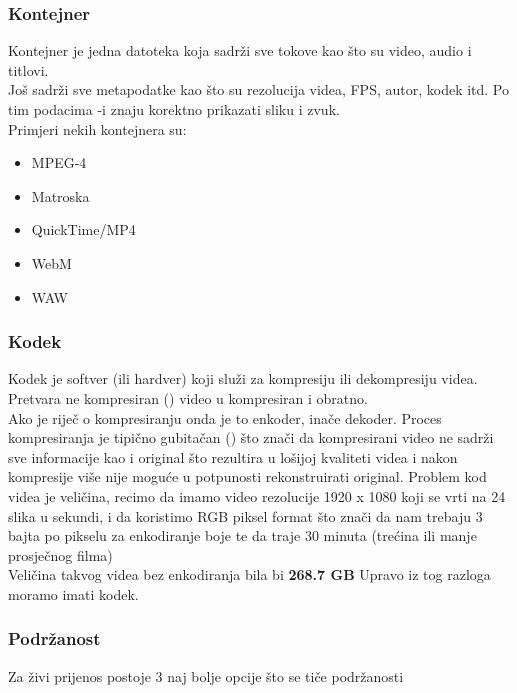 \subsubsection{Kontejner} \label{sec:container}
Kontejner je jedna datoteka koja sadrži sve tokove kao što su video, audio i titlovi.\\
Još sadrži sve metapodatke kao što su rezolucija videa, FPS, autor, kodek itd. Po tim 
podacima \hyperref[sct:videoPlayer]{}-i znaju korektno prikazati sliku i zvuk. \cite{ffmpegBook}
\\
Primjeri nekih kontejnera su:
\begin{itemize}
  \item MPEG-4
  \item Matroska
  \item QuickTime/MP4
  \item WebM
  \item WAW
\end{itemize}

\subsubsection{Kodek} \label{sec:codec}
Kodek je softver (ili hardver) koji služi za kompresiju ili dekompresiju videa. \\
Pretvara ne kompresiran () video u kompresiran i obratno. \\
Ako je riječ o kompresiranju onda je to enkoder, inače dekoder. \cite{ffmpegBook}
\paraBreak
Proces kompresiranja je tipično gubitačan () što znači da kompresirani video ne sadrži sve informacije kao i original
što rezultira u lošijoj kvaliteti videa i nakon kompresije više nije moguće u potpunosti rekonstruirati original. \cite{ffmpegBook}
\paraBreak
Problem kod videa je veličina, recimo da imamo video rezolucije 1920 x 1080 koji se vrti na 24 slika u sekundi, i da 
koristimo RGB piksel format što znači da nam trebaju 3 bajta po pikselu za enkodiranje boje te da traje 30 minuta 
(trećina ili manje prosječnog filma) \\
Veličina takvog videa bez enkodiranja bila bi \textbf{268.7 GB} \label{sec:size_problem} \cite{ffmpegBook}
\paraBreak
Upravo iz tog razloga moramo imati kodek.

\subsubsection{Podržanost}
Za živi prijenos postoje 3 naj bolje opcije što se tiče podržanosti \cite{appleCodec} \cite{androidCodec} \cite{canIUse}

